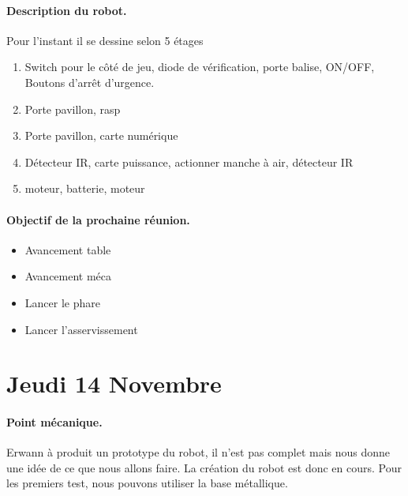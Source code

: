 \documentclass[a4paper,10pt]{report}
\begin{document}
\begin{spacing}{1.5}
\begin{center}
\end{center}

\paragraph*{Description du robot.}
Pour l'instant il se dessine selon 5 étages
\begin{enumerate}
	\item Switch pour le côté de jeu, diode de vérification, porte balise, ON/OFF, Boutons d'arrêt d'urgence.
	\item Porte pavillon, rasp
	\item Porte pavillon, carte numérique
	\item Détecteur IR, carte puissance, actionner manche à air, détecteur IR
	\item moteur, batterie, moteur
\end{enumerate}

\paragraph*{Objectif de la prochaine réunion.}
\begin{itemize}
	\item Avancement table
	\item Avancement méca
	\item Lancer le phare
	\item Lancer l'asservissement
\end{itemize}

\newpage
\section*{Jeudi 14 Novembre}
\paragraph*{Point mécanique.}
Erwann à produit un prototype du robot, il n'est pas complet mais nous donne une idée de ce que nous allons faire. La création du robot est donc en cours.
Pour les premiers test, nous pouvons utiliser la base métallique.


\end{spacing}
\end{document}
